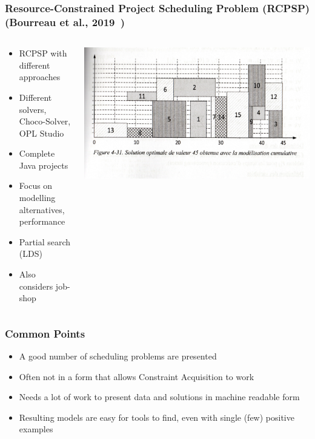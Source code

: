 \documentclass[dvipsnames,aspectratio=169]{beamer}
\begin{document}
\begin{frame}
\frametitle{Resource-Constrained Project Scheduling Problem (RCPSP) (Bourreau et al., 2019~\cite{Bourreau2019})}
\begin{columns}
\begin{column}{0.5\textwidth}
\begin{itemize}
\item RCPSP with different approaches
\item Different solvers, Choco-Solver, OPL Studio
\item Complete Java projects
\item Focus on modelling alternatives, performance
\item Partial search (LDS)
\item Also considers job-shop
\end{itemize}
\end{column}
\begin{column}{0.5\textwidth}
\includegraphics[width=\textwidth]{images/rcpspgantt}
\end{column}
\end{columns}
\end{frame}

\begin{frame}
\frametitle{Common Points}
\begin{itemize}
\item A good number of scheduling problems are presented
\item Often not in a form that allows Constraint Acquisition to work
\item Needs a lot of work to present data and solutions in machine readable form
\item Resulting models are easy for tools to find, even with single (few) positive examples
\end{itemize}
\end{frame}
\end{document}
